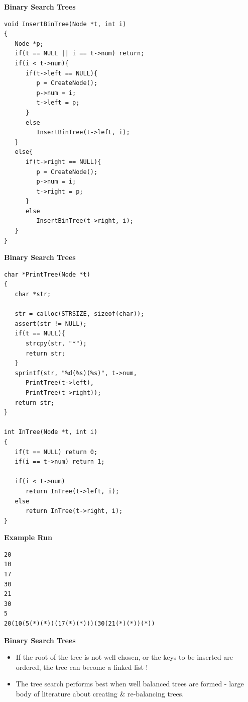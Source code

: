 \documentclass[a4,portraitt]{slides}
\begin{document}
\newpage
{\samepage
\begin{center}
{\Large{\bf Binary Search Trees}}
\end{center}
\begin{verbatim}
void InsertBinTree(Node *t, int i)
{
   Node *p;
   if(t == NULL || i == t->num) return;
   if(i < t->num){
      if(t->left == NULL){
         p = CreateNode();
         p->num = i;
         t->left = p;
      }
      else
         InsertBinTree(t->left, i);
   }
   else{
      if(t->right == NULL){
         p = CreateNode();
         p->num = i;
         t->right = p;
      }
      else
         InsertBinTree(t->right, i);
   }
}
\end{verbatim}
}

\newpage
{\samepage
\begin{center}
{\Large{\bf Binary Search Trees}}
\end{center}
{\small
\begin{verbatim}
char *PrintTree(Node *t)
{
   char *str;

   str = calloc(STRSIZE, sizeof(char));
   assert(str != NULL);
   if(t == NULL){
      strcpy(str, "*");
      return str;
   }
   sprintf(str, "%d(%s)(%s)", t->num,
      PrintTree(t->left),
      PrintTree(t->right));
   return str;
}

int InTree(Node *t, int i)
{
   if(t == NULL) return 0;
   if(i == t->num) return 1;

   if(i < t->num)
      return InTree(t->left, i);
   else
      return InTree(t->right, i);
}
\end{verbatim}
}
}

\newpage
{\samepage
\begin{center}
{\Large{\bf Example Run}}
\end{center}
\begin{verbatim}
20
10
17
30
21
30
5
20(10(5(*)(*))(17(*)(*)))(30(21(*)(*))(*))
\end{verbatim}
}

\newpage
{\samepage
\begin{center}
{\Large{\bf Binary Search Trees}}
\end{center}
\begin{itemize}
\item  If the root of the tree is not well chosen, or the keys to be inserted are ordered, the tree can become a linked list !
\item The tree search performs best when well balanced trees are formed - large
body of literature about creating \& re-balancing trees.
\end{itemize}
}
\end{document}
